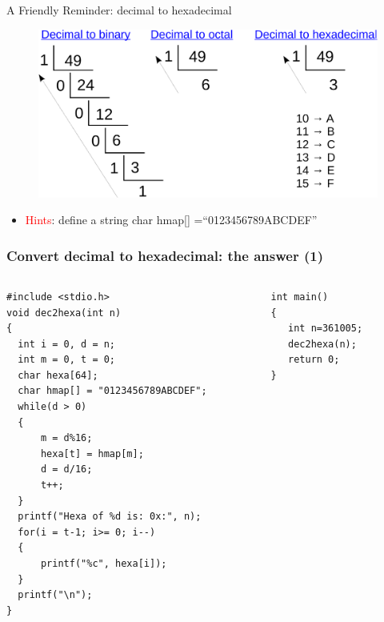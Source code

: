 \begin{frame}{A Friendly Reminder: decimal to hexadecimal}
	\begin{figure}
		\begin{center}
		\includegraphics[width=0.85\linewidth]{figs/d2b.pdf}		
		\end{center}
	\end{figure}
\begin{itemize}
	\item {\textcolor{red}{Hints}: define a string char hmap[] =``0123456789ABCDEF''}
\end{itemize}
\end{frame}

\ifx\answer{}
\begin{frame}[fragile]
\frametitle{Convert decimal to hexadecimal: the answer (1)}
\vspace{-0.3in}
\begin{columns}
\begin{column}{0.62\linewidth}
\begin{lstlisting}[xleftmargin=0.05\linewidth,linewidth=0.95\linewidth]
#include <stdio.h>
void dec2hexa(int n)
{
  int i = 0, d = n;
  int m = 0, t = 0;
  char hexa[64];
  char hmap[] = "0123456789ABCDEF";
  while(d > 0)
  {
      m = d%16;
      hexa[t] = hmap[m];
      d = d/16;
      t++;
  }
  printf("Hexa of %d is: 0x:", n);
  for(i = t-1; i>= 0; i--)
  {
      printf("%c", hexa[i]);
  }
  printf("\n");
}
\end{lstlisting}
\end{column}
\begin{column}{0.38\linewidth}
\begin{lstlisting}[firstnumber=14, linewidth=0.95\linewidth]
int main()
{
   int n=361005;
   dec2hexa(n);
   return 0;
}
\end{lstlisting}
\end{column}
\end{columns}
\end{frame}
\fi

